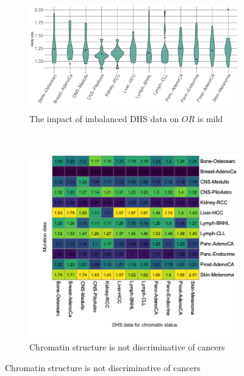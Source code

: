 \begin{figure}[ht!]
    \begin{subfigure}{\textwidth}
    \centering
    \includegraphics[scale=0.5]{graphics/mixed_or_violin.pdf}
    \caption{The impact of imbalanced DHS data on $OR$ is mild}
    \label{fig:mixed_or_violin}
    \end{subfigure} \\
    
    \vspace{0.3cm}
    \begin{subfigure}{\textwidth}
    \centering
    \includegraphics[scale=0.52]{graphics/mixed_or_heatmap.png}
    \caption{Chromatin structure is not discriminative of cancers}
    \label{fig:mixed_or_heatmap}
    \end{subfigure} 


\end{figure}
